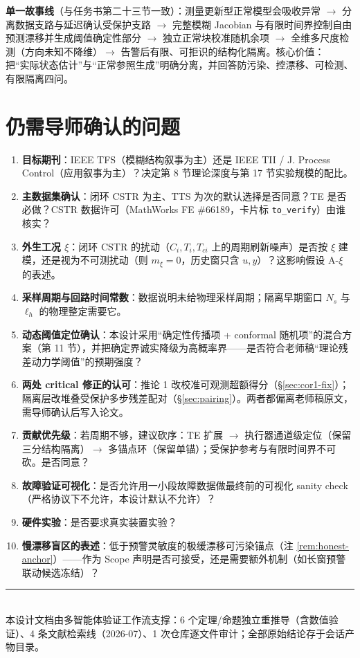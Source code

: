 \documentclass[11pt,a4paper]{ctexart}
\theoremstyle{remark}
\begin{document}
\textbf{单一故事线}（与任务书第二十三节一致）：测量更新型正常模型会吸收异常 $\to$ 分离数据支路与延迟确认受保护支路 $\to$ 完整模糊 Jacobian 与有限时间界控制自由预测漂移并生成阈值确定性部分 $\to$ 独立正常块校准随机余项 $\to$ 全维多尺度检测（方向未知不降维）$\to$ 告警后有限、可拒识的结构化隔离。核心价值：$\boxed{\text{把“实际状态估计”与“正常参照生成”明确分离}}$，并回答防污染、控漂移、可检测、有限隔离四问。

\section{仍需导师确认的问题}

\begin{enumerate}
\item \textbf{目标期刊}：IEEE TFS（模糊结构叙事为主）还是 IEEE TII / J. Process Control（应用叙事为主）？决定第 8 节理论深度与第 17 节实验规模的配比。
\item \textbf{主数据集确认}：闭环 CSTR 为主、TTS 为次的默认选择是否同意？TE 是否必做？CSTR 数据许可（MathWorks FE \#66189，卡片标 \texttt{to\_verify}）由谁核实？
\item \textbf{外生工况 $\xi$}：闭环 CSTR 的扰动（$C_i,T_i,T_{ci}$ 上的周期刷新噪声）是否按 $\xi$ 建模，还是视为不可测扰动（则 $m_\xi=0$，历史窗只含 $u,y$）？这影响假设 A-$\xi$ 的表述。
\item \textbf{采样周期与回路时间常数}：数据说明未给物理采样周期；隔离早期窗口 $N_s$ 与 $\ell_h$ 的物理整定需要它。
\item \textbf{动态阈值定位确认}：本设计采用“确定性传播项 + conformal 随机项”的混合方案（第 11 节），并把确定界诚实降级为高概率界——是否符合老师稿“理论残差动力学阈值”的预期强度？
\item \textbf{两处 critical 修正的认可}：推论 1 改校准可观测超额得分（\S\ref{sec:cor1-fix}）；隔离层改堆叠受保护多步残差配对（\S\ref{sec:pairing}）。两者都偏离老师稿原文，需导师确认后写入论文。
\item \textbf{贡献优先级}：若周期不够，建议砍序：TE 扩展 $\to$ 执行器通道级定位（保留三分结构隔离）$\to$ 多锚点环（保留单锚）；受保护参考与有限时间界不可砍。是否同意？
\item \textbf{故障验证可视化}：是否允许用一小段故障数据做最终前的可视化 sanity check（严格协议下不允许，本设计默认不允许）？
\item \textbf{硬件实验}：是否要求真实装置实验？
\item \textbf{慢漂移盲区的表述}：低于预警灵敏度的极缓漂移可污染锚点（注 \ref{rem:honest-anchor}）——作为 Scope 声明是否可接受，还是需要额外机制（如长窗预警联动候选冻结）？
\end{enumerate}

\bigskip
\begin{center}
\rule{0.6\textwidth}{0.4pt}\\[4pt]
\small 本设计文档由多智能体验证工作流支撑：6 个定理/命题独立重推导（含数值验证）、4 条文献检索线（2026-07）、1 次仓库逐文件审计；全部原始结论存于会话产物目录。
\end{center}
\end{document}
